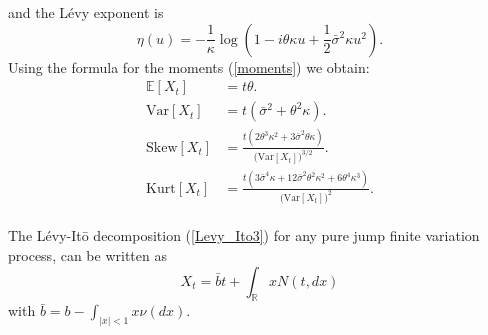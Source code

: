 \documentclass[a4paper,10pt]{article}
\newcommand{\numberset}{\mathbb}
\newcommand{\R}{\numberset{R}}
\newcommand{\E}{\numberset{E}}
\begin{document}
and the Lévy exponent is 
\begin{equation}
 \eta(u) = -\frac{1}{\kappa} \log(1-i\theta \kappa u + \frac{1}{2} \bar\sigma^2 \kappa u^2).
\end{equation}
Using the formula for the moments (\ref{moments}) we obtain:
\begin{align}\label{VG_cumulants}
 \E[X_t] &= t\theta. \\ \nonumber
 \mbox{Var}[X_t] &= t(\bar\sigma^2 + \theta^2 \kappa). \\ \nonumber
 \mbox{Skew}[X_t] &= \frac{t (2\theta^3\kappa^2 + 3 \bar\sigma^2 \theta \kappa)}{\bigl(\mbox{Var}[X_t])^{3/2}}. \\ \nonumber
 \mbox{Kurt}[X_t] &= \frac{t (3\bar\sigma^4 \kappa + 12\bar\sigma^2 \theta^2 \kappa^2 +6\theta^4\kappa^3)}{\bigl(\mbox{Var}[X_t]\bigr)^2}.\nonumber 
\end{align}
\\
The Lévy-It\={o} decomposition (\ref{Levy_Ito3}) for any pure jump finite variation process, 
can be written as
\begin{equation}\label{Levy_Ito4}
X_t = \bar b t + \int_{\R} x N(t,dx) 
\end{equation}
with $\bar b = b - \int_{|x|<1} x \nu(dx)$. 
\end{document}

